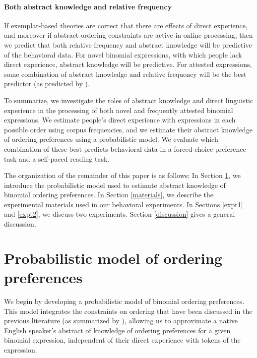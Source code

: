\documentclass[authoryear]{elsarticle}
\begin{document}
\paragraph{Both abstract knowledge and relative frequency}
If exemplar-based theories are correct that there are effects of direct experience, and moreover if abstract ordering constraints are active in online processing, then we predict that both relative frequency and abstract knowledge will be predictive of the behavioral data. For novel binomial expressions, with which people lack direct experience, abstract knowledge will be predictive. For attested expressions, some combination of abstract knowledge and relative frequency will be the best predictor (as predicted by \citealp{Bod:2003uw, ODonnell:2011vh, Post:2013hh}).

To summarize, we investigate the roles of abstract knowledge and direct linguistic experience in the processing of both novel and frequently attested binomial expressions. We estimate people's direct experience with expressions in each possible order using corpus frequencies, and we estimate their abstract knowledge of ordering preferences using a probabilistic model. We evaluate which combination of these best predicts behavioral data in a forced-choice preference task and a self-paced reading task.

The organization of the remainder of this paper is as follows: In Section \ref{model}, we introduce the probabilistic model used to estimate abstract knowledge of binomial ordering preferences. In Section \ref{materials}, we describe the experimental materials used in our behavioral experiments. In Sections \ref{expt1} and \ref{expt2}, we discuss two experiments. Section \ref{discussion} gives a general discussion.

\section{Probabilistic model of ordering preferences}\label{model}
We begin by developing a probabilistic model of binomial ordering preferences. This model integrates the constraints on ordering that have been discussed in the previous literature (as summarized by \citealp{Benor:2006gv}), allowing us to approximate a native English speaker's abstract of knowledge of ordering preferences for a given binomial expression, independent of their direct experience with tokens of the expression.
\end{document}
